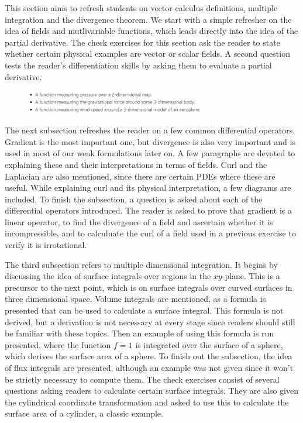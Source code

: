 This section aims to refresh students on vector calculus definitions, multiple integration and the divergence theorem. We start with a simple refresher on the idea of fields and mutlivariable functions, which leads directly into the idea of the partial derivative. The check exercises for this section ask the reader to state whether certain physical examples are vector or scalar fields. A second question tests the reader's differentiation skills by asking them to evaluate a partial derivative.

\begin{figure}[h]
\centering
\includegraphics[width=0.7\textwidth, frame]{./images/notebook1/3}
\end{figure}

The next subsection refreshes the reader on a few common differential operators. Gradient is the most important one, but divergence is also very important and is used in most of our weak formulations
later on. A few paragraphs are devoted to explaining these and their interpretations in terms of fields. Curl and the Laplacian are also mentioned, since there are certain PDEs where these are useful. While explaining curl and its physical interpretation, a few diagrams are included. To finish the subsection, a question is asked about each of the differential operators introduced. The reader is asked to prove that gradient is a linear operator, to find the divergence of a field and ascertain whether it is incompressible, and to calculuate the curl of a field used in a previous exercise to verify it is irrotational.

The third subsection refers to multiple dimensional integration. It begins by discussing the idea of surface integrals over regions in the $xy$-plane. This is a precursor to the next point, which is on surface integrals over curved surfaces in three dimensional space. Volume integrals are mentioned, as a formula is presented that can be used to calculate a surface integral. This formula is not derived, but a derivation is not necessary at every stage since readers should still be familiar with these topics. Then an example of using this formula is run presented, where the function $f=1$ is integrated over the surface of a sphere, which derives the surface area of a sphere. To finish out the subsection, the idea of flux integrals are presented, although an example was not given since it won't be strictly necessary to compute them. The check exercises consist of several questions asking readers to calculate certain surface integrals. They are also given the cylindrical coordinate transformation and asked to use this to calculate the surface area of a cylinder, a classic example.

